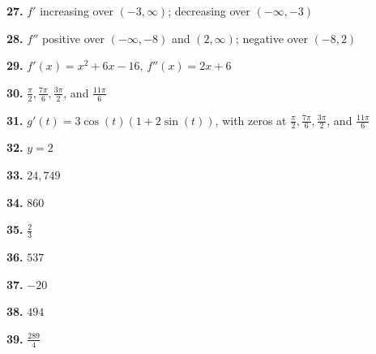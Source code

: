 \documentclass[12pt,]{book}
\theoremstyle{plain}
\theoremstyle{definition}
\numberwithin{equation}{section}
\newcommand{\fe}[2]{#1\mathopen{}\left(#2\right)\mathclose{}}
\newcommand{\ointerval}[2]{\left(#1,#2\right)}
\newcommand{\fd}[1]{#1'}
\newcommand{\sd}[1]{#1''}
\begin{document}
                \par\smallskip
\noindent\textbf{27.}\quad{}
                    \(\fd{f}\) increasing over \(\ointerval{-3}{\infty}\); decreasing over \(\ointerval{-\infty}{-3}\)%

                \par\smallskip
\noindent\textbf{28.}\quad{}
                    \(\sd{f}\) positive over \(\ointerval{-\infty}{-8}\) and \(\ointerval{2}{\infty}\); negative over \(\ointerval{-8}{2}\)%

                \par\smallskip
\noindent\textbf{29.}\quad{}
                    \(\fe{\fd{f}}{x}=x^2+6x-16\), \(\fe{\sd{f}}{x}=2x+6\)%

                \par\smallskip
\noindent\textbf{30.}\quad{}
                    \(\frac{\pi}{2},\frac{7\pi}{6},\frac{3\pi}{2}\), and \(\frac{11\pi}{6}\)%

                \par\smallskip
\noindent\textbf{31.}\quad{}
                    \(\fe{\fd{g}}{t}=3\fe{\cos}{t}\left(1+2\fe{\sin}{t}\right)\), with zeros at \(\frac{\pi}{2},\frac{7\pi}{6},\frac{3\pi}{2}\), and \(\frac{11\pi}{6}\)%

                \par\smallskip
\noindent\textbf{32.}\quad{}
                \(y=2\)%

            \par\smallskip
\noindent\textbf{33.}\quad{}
                    \(24{,}749\)%

                \par\smallskip
\noindent\textbf{34.}\quad{}
                    \(860\)%

                \par\smallskip
\noindent\textbf{35.}\quad{}
                    \(\frac{2}{3}\)%

                \par\smallskip
\noindent\textbf{36.}\quad{}
                    \(537\)%

                \par\smallskip
\noindent\textbf{37.}\quad{}
                    \(-20\)%

                \par\smallskip
\noindent\textbf{38.}\quad{}
                    \(494\)%

                \par\smallskip
\noindent\textbf{39.}\quad{}
                    \(\frac{289}{4}\)%
\end{document}
